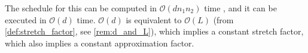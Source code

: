 
The schedule for this can be computed in \(\mathcal{O}(dn_1 n_2)\) time \cite{siamcomp/DemaineFKMS19}, and it can be executed in \(\mathcal{O}(d)\) time.
\(\mathcal{O}(d)\) is equivalent to \(\mathcal O (L)\) (from \cref{def:stretch_factor}, see \cref{rem:d_and_L}), which implies a constant stretch factor, which also implies a constant approximation factor. 

